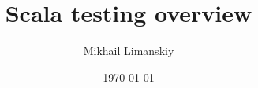 \documentclass{beamer}
\title{Scala testing overview}
\author{Mikhail Limanskiy}
\institute{SymphonyTeleca}
\date{\today}
\begin{document}
\begin{frame}
    \titlepage
\end{frame}

\begin{frame}

\end{frame}


\end{document}
